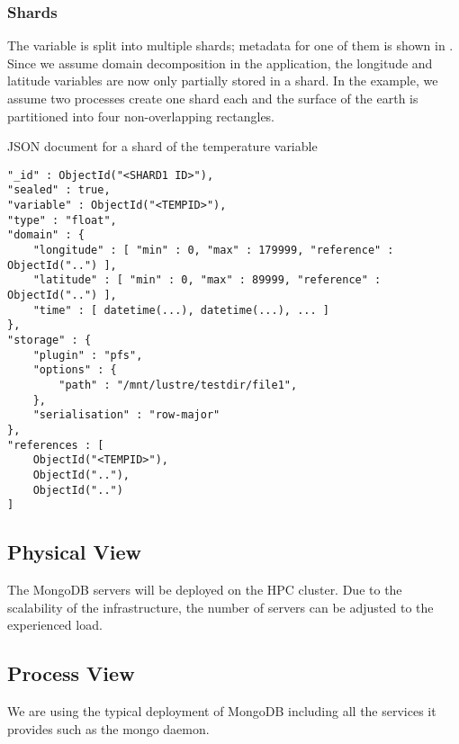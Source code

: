 \subsubsection{Shards}

The variable is split into multiple shards; metadata for one of them is shown in .
Since we assume domain decomposition in the application, the longitude and latitude variables are now only partially stored in a shard.
In the example, we assume two processes create one shard each and the surface of the earth is partitioned into four non-overlapping rectangles.

\begin{tcbcode}[label={lst:mongotemperatureshard}]{JSON document for a shard of the temperature variable}
\begin{lstlisting}
"_id" : ObjectId("<SHARD1 ID>"),
"sealed" : true,
"variable" : ObjectId("<TEMPID>"),
"type" : "float",
"domain" : {
	"longitude" : [ "min" : 0, "max" : 179999, "reference" : ObjectId("..") ],
	"latitude" : [ "min" : 0, "max" : 89999, "reference" : ObjectId("..") ],
	"time" : [ datetime(...), datetime(...), ... ]
},
"storage" : {
	"plugin" : "pfs",
	"options" : {
		"path" : "/mnt/lustre/testdir/file1",
	},
	"serialisation" : "row-major"
},
"references : [
	ObjectId("<TEMPID>"),
	ObjectId(".."),
	ObjectId("..")
]
\end{lstlisting}
\end{tcbcode}


\subsection{Physical View}
\label{backend: mongo/physical}

The MongoDB servers will be deployed on the HPC cluster.
Due to the scalability of the infrastructure, the number of servers can be adjusted to the experienced load.


\subsection{Process View}
\label{backend: mongo/process}

We are using the typical deployment of MongoDB including all the services it provides such as the mongo daemon.

